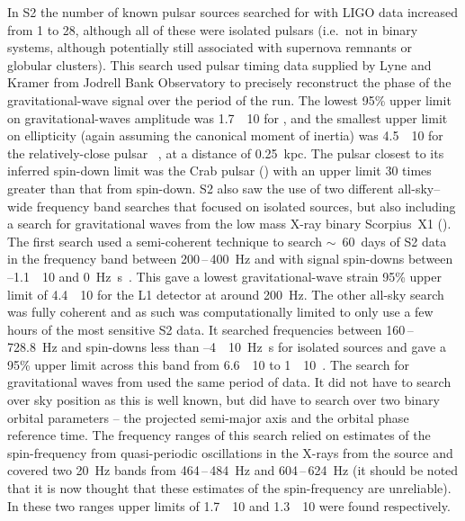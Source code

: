 In S2 the number of known pulsar sources searched for with LIGO data increased
from 1 to 28, although all of these were isolated pulsars (i.e.\, not in binary
systems, although potentially still associated with supernova remnants or
globular clusters). This search used pulsar timing data supplied by Lyne
and Kramer from Jodrell Bank Observatory to precisely reconstruct the
phase of the gravitational-wave signal over the period of the run. The lowest
95\% upper limit on gravitational-waves amplitude was
1.7~\texttimes~10 for , and the smallest
upper limit on ellipticity (again assuming the canonical moment of
inertia) was 4.5~\texttimes~10 for the relatively-close
pulsar ~\cite{Abbott:2005f}, at a distance of
0.25~kpc. The pulsar closest to its inferred spin-down limit was the
Crab pulsar () with an upper limit 30 times greater than
that from spin-down. S2 also saw the use of two different all-sky--wide
frequency band searches that focused on isolated sources, but also
including a search for gravitational waves from the low mass X-ray
binary Scorpius~X1 (). The first search used a semi-coherent
technique to search $\sim$~60~days of S2 data in the frequency band
between 200\,--\,400~Hz and with signal spin-downs between
--1.1~\texttimes~10 and
0~Hz~s~\cite{Abbott:2005g}. This gave a lowest gravitational-wave strain 95\% upper limit of 4.4~\texttimes~10 for the
L1 detector at around 200~Hz. The other all-sky search was fully
coherent and as such was computationally limited to only use a few
hours of the most sensitive S2 data. It searched frequencies between
160\,--\,728.8~Hz and spin-downs less than
--4~\texttimes~10~Hz~s for isolated sources and
gave a 95\% upper limit across this band from
6.6~\texttimes~10 to 1~\texttimes~10~\cite{Abbott:2007a}. The search for gravitational waves from  used the
same period of data. It did not have to search over sky position as this is well
known, but did have to search over two binary orbital parameters -- the projected
semi-major axis and the orbital phase reference time. The frequency ranges of
this search relied on estimates of the spin-frequency from quasi-periodic
oscillations in the X-rays from the source and covered two 20~Hz bands from
464\,--\,484~Hz and 604\,--\,624~Hz (it should be noted that it is now
thought that these estimates of the spin-frequency are unreliable). In
these two ranges upper limits of 1.7~\texttimes~10 and
1.3~\texttimes~10 were found respectively.


